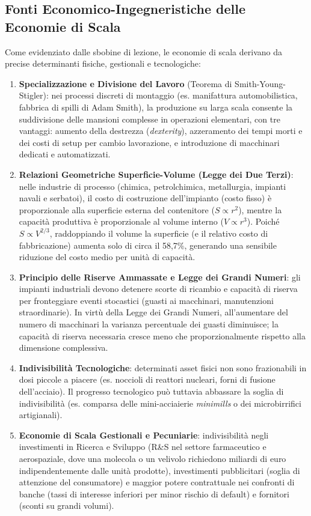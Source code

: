 \subsection{Fonti Economico-Ingegneristiche delle Economie di Scala}
Come evidenziato dalle sbobine di lezione, le economie di scala derivano da precise determinanti fisiche, gestionali e tecnologiche:
\begin{enumerate}
    \item \textbf{Specializzazione e Divisione del Lavoro} (Teorema di Smith-Young-Stigler): nei processi discreti di montaggio (es. manifattura automobilistica, fabbrica di spilli di Adam Smith), la produzione su larga scala consente la suddivisione delle mansioni complesse in operazioni elementari, con tre vantaggi: aumento della destrezza (\textit{dexterity}), azzeramento dei tempi morti e dei costi di setup per cambio lavorazione, e introduzione di macchinari dedicati e automatizzati.
    \item \textbf{Relazioni Geometriche Superficie-Volume (Legge dei Due Terzi)}: nelle industrie di processo (chimica, petrolchimica, metallurgia, impianti navali e serbatoi), il costo di costruzione dell'impianto (costo fisso) è proporzionale alla superficie esterna del contenitore ($S \propto r^2$), mentre la capacità produttiva è proporzionale al volume interno ($V \propto r^3$). Poiché $S \propto V^{2/3}$, raddoppiando il volume la superficie (e il relativo costo di fabbricazione) aumenta solo di circa il 58{,}7\%, generando una sensibile riduzione del costo medio per unità di capacità.
    \item \textbf{Principio delle Riserve Ammassate e Legge dei Grandi Numeri}: gli impianti industriali devono detenere scorte di ricambio e capacità di riserva per fronteggiare eventi stocastici (guasti ai macchinari, manutenzioni straordinarie). In virtù della Legge dei Grandi Numeri, all'aumentare del numero di macchinari la varianza percentuale dei guasti diminuisce; la capacità di riserva necessaria cresce meno che proporzionalmente rispetto alla dimensione complessiva.
    \item \textbf{Indivisibilità Tecnologiche}: determinati asset fisici non sono frazionabili in dosi piccole a piacere (es. noccioli di reattori nucleari, forni di fusione dell'acciaio). Il progresso tecnologico può tuttavia abbassare la soglia di indivisibilità (es. comparsa delle mini-acciaierie \textit{minimills} o dei microbirrifici artigianali).
    \item \textbf{Economie di Scala Gestionali e Pecuniarie}: indivisibilità negli investimenti in Ricerca e Sviluppo (R\&S nel settore farmaceutico e aerospaziale, dove una molecola o un velivolo richiedono miliardi di euro indipendentemente dalle unità prodotte), investimenti pubblicitari (soglia di attenzione del consumatore) e maggior potere contrattuale nei confronti di banche (tassi di interesse inferiori per minor rischio di default) e fornitori (sconti su grandi volumi).
\end{enumerate}

